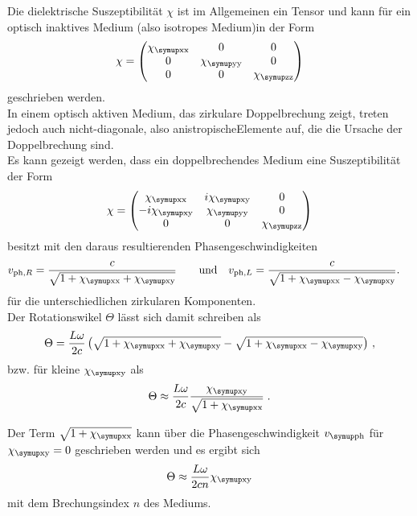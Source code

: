 Die dielektrische Suszeptibilität $\chi$ ist im Allgemeinen ein Tensor und kann für ein optisch inaktives Medium (also isotropes Medium)in der Form 
\begin{equation}
    \chi = \begin{pmatrix}
        \chi_\T{xx} & 0 & 0 \\
        0 & \chi_\T{yy} & 0 \\
        0 & 0 & \chi_\T{zz}
    \end{pmatrix}
\end{equation}
geschrieben werden. \\
In einem optisch aktiven Medium, das zirkulare Doppelbrechung zeigt, treten jedoch auch nicht-diagonale, also anistropischeElemente auf, die die Ursache der Doppelbrechung sind. \\
Es kann gezeigt werden, dass ein doppelbrechendes Medium eine Suszeptibilität der Form
\begin{equation}
    \chi = \begin{pmatrix}
        \chi_\T{xx} & i\chi_\T{xy} & 0 \\
        -i\chi_\T{xy} & \chi_\T{yy} & 0 \\
        0 & 0 & \chi_\T{zz}
    \end{pmatrix}
    \label{eq:chi_doppelbrechung}
\end{equation}
besitzt mit den daraus resultierenden Phasengeschwindigkeiten
\begin{align*}
    v_{\text{ph},R} &= \frac{c}{\sqrt{1 + \chi_\T{xx} + \chi_\T{xy}}} & \quad \text{und} & &
    v_{\text{ph},L} &= \frac{c}{\sqrt{1 + \chi_\T{xx} - \chi_\T{xy}}}.
\end{align*}
für die unterschiedlichen zirkularen Komponenten. \\
Der Rotationswikel $\Theta$ lässt sich damit schreiben als
\begin{equation}
    \Theta = \frac{L\omega}{2c}\left(\sqrt{1+\chi_\T{xx} + \chi_\T{xy}} - \sqrt{1+\chi_\T{xx}-\chi_\T{xy}}\right) \, ,
\end{equation} 
bzw. für kleine $\chi_\T{xy}$ als
\begin{equation}
    \Theta \approx \frac{L\omega}{2c}\frac{\chi_\T{xy}}{\sqrt{1+\chi_\T{xx}}} \; .
\end{equation}

Der Term $\sqrt{1+\chi_\T{xx}}$ kann über die Phasengeschwindigkeit $v_\T{ph}$ für $\chi_\T{xy} = 0$ geschrieben werden und es ergibt sich 
\begin{equation}
    \Theta \approx \frac{L\omega}{2 c n}\chi_\T{xy} 
    \label{eq:theta_chi}
\end{equation} 
mit dem Brechungsindex $n$ des Mediums.

